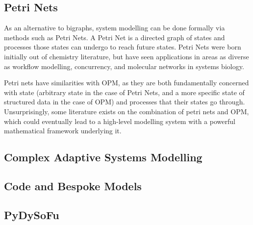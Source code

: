 \documentclass[draft]{article}
\begin{document}
\subsection{Petri Nets}
\label{subsubsec:petrinets}
As an alternative to bigraphs, system modelling can be done formally via methods
such as Petri Nets\cite{petri_net_seminal}. A Petri Net is a directed graph of
states and processes those states can undergo to reach future states. Petri Nets
were born initially out of chemistry literature\cite{petri_net_seminal}, but
have seen applications in areas as diverse as workflow
modelling\cite{petri_net_workflow_modelling},
concurrency\cite{petri_net_concurrency}, and molecular networks in systems
biology\cite{petri_nets_for_biology}.\par

Petri nets have similarities with OPM, as they are both fundamentally concerned
with state (arbitrary state in the case of Petri Nets, and a more specific state
of structured data in the case of OPM) and processes that their states go
through. Unsurprisingly, some literature exists on the combination of petri nets
and OPM, which could eventually lead to a high-level modelling system with a
powerful mathematical framework underlying it.\par




\subsection{Complex Adaptive Systems Modelling}



\subsection{Code and Bespoke Models}


\subsection{PyDySoFu}
\end{document}

